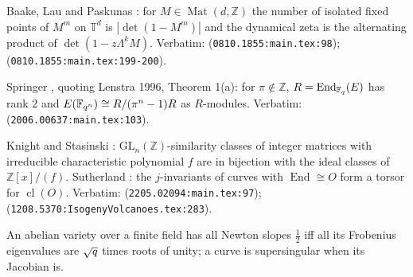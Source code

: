 \begin{citedfact}
\label{cit:toral-lefschetz}
Baake, Lau and Paskunas \cite{baake2008toral}: for $M\in\operatorname{Mat}(d,\mathbb Z)$ the
number of isolated fixed points of $M^m$ on $\mathbb T^d$ is $|\det(1-M^m)|$ and the dynamical
zeta is the alternating product of $\det(1-z\Lambda^kM)$. %
Verbatim: \texttt{} (\texttt{0810.1855:main.tex:98});
\texttt{}
(\texttt{0810.1855:main.tex:199-200}).
\end{citedfact}

\begin{citedfact}
\label{cit:lenstra-structure}
Springer \cite{springer2020cm}, quoting Lenstra 1996, Theorem 1(a): for $\pi\notin\mathbb Z$,
$R = \operatorname{End}_{\mathbb F_q}(E)$ has rank $2$ and $E(\mathbb F_{q^{n}})\cong R/(\pi^n-1)R$ as $R$-modules.
Verbatim: \texttt{} (\texttt{2006.00637:main.tex:103}).
\end{citedfact}

\begin{citedfact}
\label{cit:latimer-macduffee}
Knight and Stasinski \cite{knightstasinski2022latimer}: $\mathrm{GL}_n(\mathbb Z)$-similarity
classes of integer matrices with irreducible characteristic polynomial $f$ are in bijection
with the ideal classes of $\mathbb Z[x]/(f)$. Sutherland \cite{sutherland2012volcanoes}: the
$j$-invariants of curves with $\operatorname{End}\cong O$ form a torsor for $\operatorname{cl}(O)$.
Verbatim: \texttt{} (\texttt{2205.02094:main.tex:97});
\texttt{}
(\texttt{1208.5370:IsogenyVolcanoes.tex:283}).
\end{citedfact}

\begin{assumption}
\label{asm:supersingular-newton}
An abelian variety over a finite field has all Newton slopes $\tfrac12$ iff all its Frobenius
eigenvalues are $\sqrt{q}$ times roots of unity; a curve is supersingular when its Jacobian
is.
\end{assumption}

